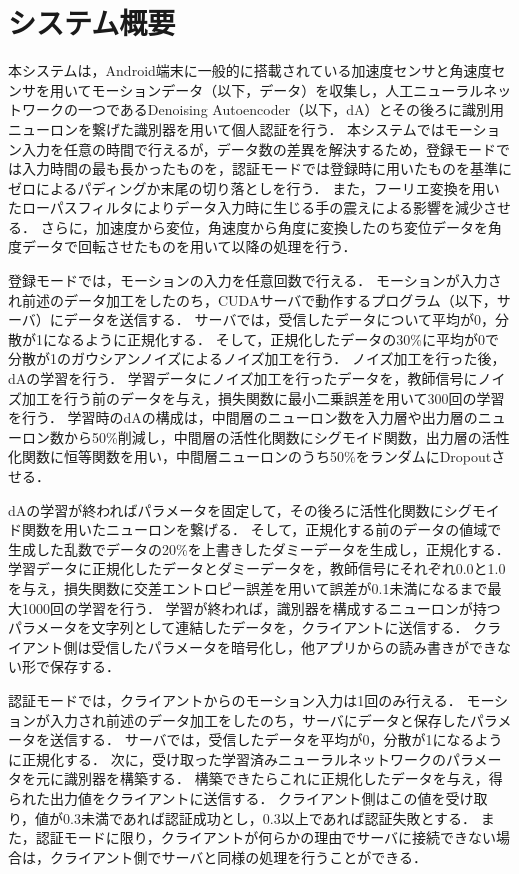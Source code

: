 \section{システム概要}
本システムは，Android端末に一般的に搭載されている加速度センサと角速度センサを用いてモーションデータ（以下，データ）を収集し，人工ニューラルネットワークの一つであるDenoising Autoencoder（以下，dA）とその後ろに識別用ニューロンを繋げた識別器を用いて個人認証を行う．
本システムではモーション入力を任意の時間で行えるが，データ数の差異を解決するため，登録モードでは入力時間の最も長かったものを，認証モードでは登録時に用いたものを基準にゼロによるパディングか末尾の切り落としを行う．
また，フーリエ変換を用いたローパスフィルタによりデータ入力時に生じる手の震えによる影響を減少させる．
さらに，加速度から変位，角速度から角度に変換したのち変位データを角度データで回転させたものを用いて以降の処理を行う．

登録モードでは，モーションの入力を任意回数で行える．
モーションが入力され前述のデータ加工をしたのち，CUDAサーバで動作するプログラム（以下，サーバ）にデータを送信する．
サーバでは，受信したデータについて平均が0，分散が1になるように正規化する．
そして，正規化したデータの30\%に平均が0で分散が1のガウシアンノイズによるノイズ加工を行う．
ノイズ加工を行った後，dAの学習を行う．
学習データにノイズ加工を行ったデータを，教師信号にノイズ加工を行う前のデータを与え，損失関数に最小二乗誤差を用いて300回の学習を行う．
学習時のdAの構成は，中間層のニューロン数を入力層や出力層のニューロン数から50\%削減し，中間層の活性化関数にシグモイド関数，出力層の活性化関数に恒等関数を用い，中間層ニューロンのうち50\%をランダムにDropoutさせる．

dAの学習が終わればパラメータを固定して，その後ろに活性化関数にシグモイド関数を用いたニューロンを繋げる．
そして，正規化する前のデータの値域で生成した乱数でデータの20\%を上書きしたダミーデータを生成し，正規化する．
学習データに正規化したデータとダミーデータを，教師信号にそれぞれ0.0と1.0を与え，損失関数に交差エントロピー誤差を用いて誤差が0.1未満になるまで最大1000回の学習を行う．
学習が終われば，識別器を構成するニューロンが持つパラメータを文字列として連結したデータを，クライアントに送信する．
クライアント側は受信したパラメータを暗号化し，他アプリからの読み書きができない形で保存する．

認証モードでは，クライアントからのモーション入力は1回のみ行える．
モーションが入力され前述のデータ加工をしたのち，サーバにデータと保存したパラメータを送信する．
サーバでは，受信したデータを平均が0，分散が1になるように正規化する．
次に，受け取った学習済みニューラルネットワークのパラメータを元に識別器を構築する．
構築できたらこれに正規化したデータを与え，得られた出力値をクライアントに送信する．
クライアント側はこの値を受け取り，値が0.3未満であれば認証成功とし，0.3以上であれば認証失敗とする．
また，認証モードに限り，クライアントが何らかの理由でサーバに接続できない場合は，クライアント側でサーバと同様の処理を行うことができる．
